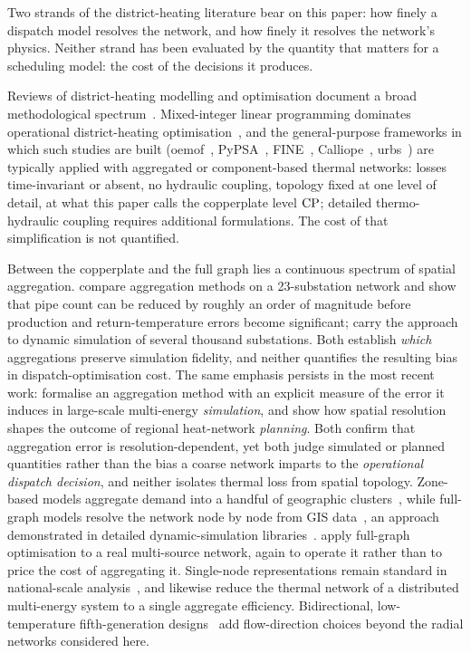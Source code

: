 
Two strands of the district-heating literature bear on this paper: how finely a
dispatch model resolves the network, and how finely it resolves the network's physics.
Neither strand has been evaluated by the quantity that matters for a scheduling model:
the cost of the decisions it produces.

Reviews of district-heating modelling and optimisation document a broad methodological
spectrum~\citep{Talebi2016}. Mixed-integer linear programming dominates operational district-heating
optimisation~\cite{Fang2016}, and the general-purpose frameworks in which such studies are
built (oemof~\cite{Hilpert2018_oemof}, PyPSA~\cite{Brown2018_pypsa},
FINE~\cite{Welder2018_FINE}, Calliope~\cite{Pfenninger2018_calliope},
urbs~\cite{Dorfner2016_urbs}) are typically applied with aggregated or component-based
thermal networks: losses time-invariant or absent, no hydraulic coupling, topology fixed at
one level of detail, at what this paper calls the copperplate level $\mathrm{CP}$; detailed
thermo-hydraulic coupling requires additional formulations. The cost of that simplification
is not quantified.

Between the copperplate and the full graph lies a continuous spectrum of spatial
aggregation. \citet{Larsen2004} compare aggregation methods on a 23-substation network
and show that pipe count can be reduced by roughly an order of magnitude before
production and return-temperature errors become significant; \citet{Falay2020} carry the
approach to dynamic simulation of several thousand substations. Both establish
\emph{which} aggregations preserve simulation fidelity, and neither quantifies the
resulting bias in dispatch-optimisation cost. The same emphasis persists in the most
recent work: \citet{Vrain2025} formalise an aggregation method with an explicit measure of
the error it induces in large-scale multi-energy \emph{simulation}, and \citet{Cassetti2025}
show how spatial resolution shapes the outcome of regional heat-network \emph{planning}.
Both confirm that aggregation error is resolution-dependent, yet both judge simulated or
planned quantities rather than the bias a coarse network imparts to the \emph{operational
dispatch decision}, and neither isolates thermal loss from spatial topology. Zone-based models aggregate demand into a
handful of geographic clusters~\cite{Wirtz2020}, while full-graph models resolve
the network node by node from GIS data~\cite{vanderHeijde2017}, an approach demonstrated in
detailed dynamic-simulation libraries~\cite{Giraud2015}. \citet{Vesterlund2017} apply
full-graph optimisation to a real multi-source network, again to operate it rather than to
price the cost of aggregating it. Single-node
representations remain standard in national-scale
analysis~\cite{Connolly2014_EnergyPLAN}, and \citet{Gabrielli2018} likewise reduce the
thermal network of a distributed multi-energy system to a single aggregate efficiency.
Bidirectional, low-temperature fifth-generation designs~\citep{Buffa2019} add flow-direction
choices beyond the radial networks considered here.

